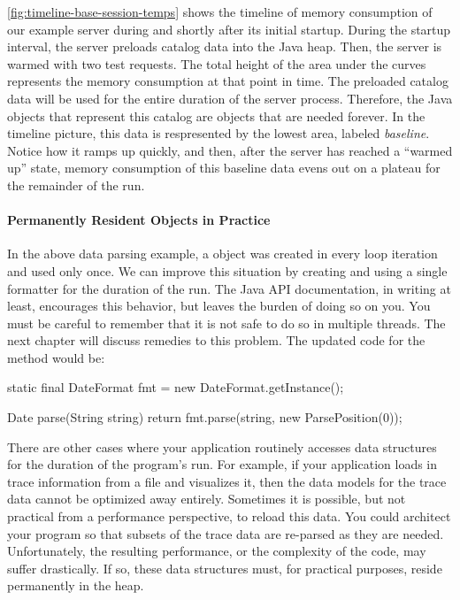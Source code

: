 \autoref{fig:timeline-base-session-temps} shows the timeline of memory
consumption of our example server 
during and shortly after its initial startup.
During the startup interval, the server preloads catalog data into
the Java heap. Then, the server is warmed with two test requests.
The total height of the area
under the curves represents the memory consumption at that point in time. 
The preloaded catalog
data will be used for the entire duration of the server process.
Therefore, the Java objects that represent this catalog are objects that are
needed forever. In the timeline picture, this data is respresented by the lowest area, labeled
\emph{baseline}. Notice how it ramps up quickly, and then, after the server has
reached a ``warmed up'' state, memory consumption of this baseline data evens out
on a plateau for the remainder of the run.

\paragraph{Permanently Resident Objects in Practice}

In the above data parsing example, a  object was
created in every loop iteration and used only once. We can improve this situation by creating and using
a single formatter for the duration of the run. The Java API documentation, in
writing at least, encourages this behavior, but leaves the burden of doing so on
you. You must be careful to remember that it is not safe to do so in multiple
threads. The next chapter will discuss remedies to this problem. The updated code
for the  method would be:

\begin{shortlisting}
static final DateFormat fmt = new DateFormat.getInstance();

Date parse(String string) {
	return fmt.parse(string, new ParsePosition(0));
}
\end{shortlisting} 

There are other cases where your application routinely accesses data structures
for the duration of the program's run. For example, if your application loads in
trace information from a file and visualizes it, then the data models for the
trace data cannot be optimized away entirely. Sometimes it is possible, but not
practical from a performance perspective, to reload this data. You could
architect your program so that subsets of the trace data are re-parsed as they
are needed. Unfortunately, the resulting performance, or the complexity of the
code, may suffer drastically. If so, these data structures must, for practical
purposes, reside permanently in the heap.


